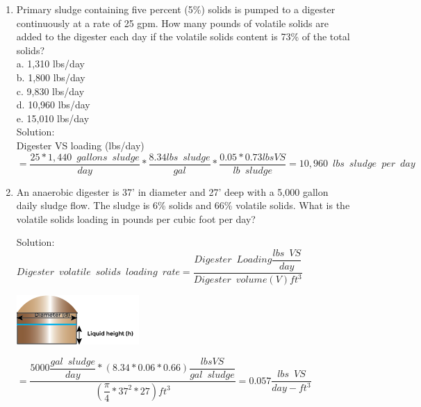 \documentclass{article}
\begin{document}
\begin{enumerate}
\item Primary sludge containing five percent (5\%) solids is pumped to a digester continuously at a rate of 25 gpm. How many pounds of volatile solids are added to the digester each day if the volatile solids content is 73\% of the total solids?\\
a. 1,310 lbs/day \\
b. 1,800 lbs/day \\
c. 9,830 lbs/day \\
d. 10,960 lbs/day \\
e. 15,010 lbs/day \\
\vspace{0.5cm}
Solution:\\
\vspace{0.5cm}
Digester VS loading (lbs/day)\\$=\dfrac{25*1,440 \enspace gallons \enspace sludge}{day}*\dfrac{8.34lbs \enspace sludge}{gal}*\dfrac{0.05*0.73lbs VS}{lb \enspace sludge}=\boxed{10,960 \enspace lbs \enspace sludge \enspace per \enspace day}$\\
\vspace{0.5cm}






\item An anaerobic digester is 37’ in diameter and 27’ deep with a 5,000 gallon daily sludge flow. The sludge is 6\% solids and 66\% volatile solids.  What is the volatile solids loading in pounds per cubic foot per day?
	
	
Solution:\\
{
$
	Digester \enspace volatile \enspace solids 			\enspace loading \enspace rate = 					\dfrac
	{
	Digester \enspace Loading 
		\dfrac
		{
		lbs \enspace VS
		}
		{
		day
		}
	}
	{
	Digester \enspace volume (V)ft^3
	}
$
}\\
\begin{center}
\includegraphics[scale=1]{DigesterWOCDimensions_1}
\end{center}

{
$=\dfrac
	{
		5000
		\dfrac
			{gal \enspace sludge}
			{day}
		*(8.34*0.06*0.66) 
		\dfrac
			{lbs VS}
			{gal \enspace  sludge}
	}
	{
		(\dfrac
			{\pi}
			{4}*37^2*27)ft^3
	}
=\boxed
	{
		0.057 \dfrac
			{lbs \enspace VS}
			{day-ft^3}
	}
$}


\end{enumerate}
\end{document}
